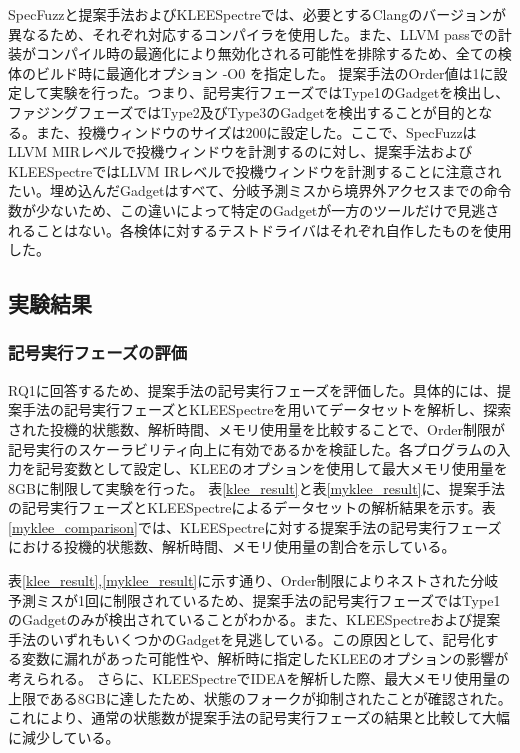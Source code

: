 SpecFuzzと提案手法およびKLEESpectreでは、必要とするClangのバージョンが異なるため、それぞれ対応するコンパイラを使用した。また、LLVM passでの計装がコンパイル時の最適化により無効化される可能性を排除するため、全ての検体のビルド時に最適化オプション -O0 を指定した。 提案手法のOrder値は1に設定して実験を行った。つまり、記号実行フェーズではType1のGadgetを検出し、ファジングフェーズではType2及びType3のGadgetを検出することが目的となる。また、投機ウィンドウのサイズは200に設定した。ここで、SpecFuzzはLLVM MIRレベルで投機ウィンドウを計測するのに対し、提案手法およびKLEESpectreではLLVM IRレベルで投機ウィンドウを計測することに注意されたい。埋め込んだGadgetはすべて、分岐予測ミスから境界外アクセスまでの命令数が少ないため、この違いによって特定のGadgetが一方のツールだけで見逃されることはない。各検体に対するテストドライバはそれぞれ自作したものを使用した。\par

\subsection{実験結果}
\subsubsection{記号実行フェーズの評価}
RQ1に回答するため、提案手法の記号実行フェーズを評価した。具体的には、提案手法の記号実行フェーズとKLEESpectreを用いてデータセットを解析し、探索された投機的状態数、解析時間、メモリ使用量を比較することで、Order制限が記号実行のスケーラビリティ向上に有効であるかを検証した。各プログラムの入力を記号変数として設定し、KLEEのオプションを使用して最大メモリ使用量を8GBに制限して実験を行った。
表\ref{klee_result}と表\ref{myklee_result}に、提案手法の記号実行フェーズとKLEESpectreによるデータセットの解析結果を示す。表\ref{myklee_comparison}では、KLEESpectreに対する提案手法の記号実行フェーズにおける投機的状態数、解析時間、メモリ使用量の割合を示している。

表\ref{klee_result},\ref{myklee_result}に示す通り、Order制限によりネストされた分岐予測ミスが1回に制限されているため、提案手法の記号実行フェーズではType1のGadgetのみが検出されていることがわかる。また、KLEESpectreおよび提案手法のいずれもいくつかのGadgetを見逃している。この原因として、記号化する変数に漏れがあった可能性や、解析時に指定したKLEEのオプションの影響が考えられる。
さらに、KLEESpectreでIDEAを解析した際、最大メモリ使用量の上限である8GBに達したため、状態のフォークが抑制されたことが確認された。これにより、通常の状態数が提案手法の記号実行フェーズの結果と比較して大幅に減少している。

